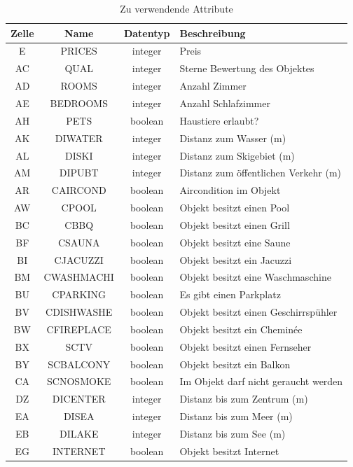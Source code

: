 \begin{table}[H] 
	\caption{Zu verwendende Attribute}
	\centering
		\label{fig:recherche:attributeinschraenkung:2}
	\begin{tabular}{ | c | c | c | l | } 
		\hline 
		\rowcolor{tableheadcolor}
		\bfseries Zelle & \bfseries Name & \bfseries Datentyp & \bfseries Beschreibung \\ \hline 
		E & PRICES & integer & Preis \\ \hline 
		AC & QUAL & integer & Sterne Bewertung des Objektes \\ \hline 
		AD & ROOMS & integer & Anzahl Zimmer \\ \hline 
		AE & BEDROOMS & integer & Anzahl Schlafzimmer \\ \hline 
		AH & PETS & boolean & Haustiere erlaubt? \\ \hline 
		AK & DIWATER & integer & Distanz zum Wasser (m) \\ \hline 
		AL & DISKI & integer & Distanz zum Skigebiet (m) \\ \hline 
		AM & DIPUBT & integer & Distanz zum öffentlichen Verkehr (m) \\ \hline 
		AR & CAIRCOND & boolean & Aircondition im Objekt\\ \hline 
		AW & CPOOL & boolean & Objekt besitzt einen Pool \\ \hline 
		BC & CBBQ & boolean & Objekt besitzt einen Grill \\ \hline 
		BF & CSAUNA & boolean & Objekt besitzt eine Saune \\ \hline 
		BI & CJACUZZI & boolean & Objekt besitzt ein Jacuzzi \\ \hline 
		BM & CWASHMACHI & boolean & Objekt besitzt eine Waschmaschine \\ \hline 
		BU & CPARKING & boolean & Es gibt einen Parkplatz \\ \hline 
		BV & CDISHWASHE & boolean & Objekt besitzt einen Geschirrspühler \\ \hline
		BW & CFIREPLACE & boolean & Objekt besitzt ein Cheminée \\ \hline 
		BX & SCTV & boolean & Objekt besitzt einen Fernseher \\ \hline  
		BY & SCBALCONY & boolean & Objekt besitzt ein Balkon \\ \hline 
		CA & SCNOSMOKE & boolean & Im Objekt darf nicht geraucht werden \\ \hline 
		DZ & DICENTER & integer & Distanz bis zum Zentrum (m) \\ \hline 
		EA & DISEA & integer & Distanz bis zum Meer (m) \\ \hline 
		EB & DILAKE & integer & Distanz bis zum See (m) \\ \hline 
		EG & INTERNET & boolean & Objekt besitzt Internet \\ \hline 
	\end{tabular}
\end{table}

